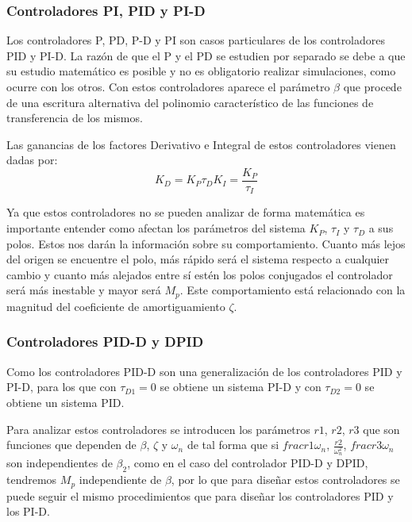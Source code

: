 \documentclass[a4paper]{article}
\begin{document}
\subsubsection{Controladores PI, PID y PI-D}
Los controladores P, PD, P-D y PI son casos particulares de los controladores PID y PI-D. La razón de que el P y el PD se estudien por separado se debe a que su estudio matemático es posible y no es obligatorio realizar simulaciones, como ocurre con los otros.
Con estos controladores aparece el parámetro $\beta$ que procede de una escritura alternativa del polinomio característico de las funciones de transferencia de los mismos.

Las ganancias de los factores Derivativo e Integral de estos controladores vienen dadas por:
\begin{subequations}
	\begin{equation}
	K_D=K_P \tau_D
	\end{equation}
	\begin{equation}
	K_I=\frac{K_P}{\tau_I}
	\end{equation}
\end{subequations}

Ya que estos controladores no se pueden analizar de forma matemática es importante entender como afectan los parámetros del sistema $K_P$, $\tau_I$ y $\tau_D$ a sus polos. Estos nos darán la información sobre su comportamiento. Cuanto más lejos del origen se encuentre el polo, más rápido será el sistema respecto a cualquier cambio y cuanto más alejados entre sí estén los polos conjugados el controlador será más inestable y mayor será $M_p$. Este comportamiento está relacionado con la magnitud del coeficiente de amortiguamiento $\zeta$.

\subsubsection{Controladores PID-D y D\textbar PID}
Como los controladores PID-D son una generalización de los controladores PID y PI-D, para los que con $\tau_{D1}=0$ se obtiene un sistema PI-D y con $\tau_{D2}=0$ se obtiene un sistema PID.

Para analizar estos controladores se introducen los parámetros $r1$, $r2$, $r3$ que son funciones que dependen de $\beta$, $\zeta$ y $\omega_n$ de tal forma que si $frac{r1}{\omega_n}$, $\frac{r2}{\omega_n^2}$, $frac{r3}{\omega_n}$ son independientes de $\beta_2$, como en el caso del controlador PID-D y D\textbar PID, tendremos $M_p$ independiente de $\beta$, por lo que para diseñar estos controladores se puede seguir el mismo procedimientos que para diseñar los controladores PID y los PI-D.
\end{document}
